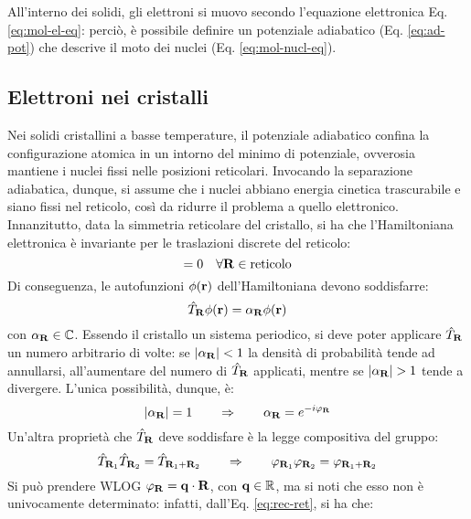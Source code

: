 All'interno dei solidi, gli elettroni si muovo secondo l'equazione elettronica Eq. \ref{eq:mol-el-eq}: perciò, è possibile definire un potenziale adiabatico (Eq. \ref{eq:ad-pot}) che descrive il moto dei nuclei (Eq. \ref{eq:mol-nucl-eq}).

\subsection{Elettroni nei cristalli}

Nei solidi cristallini a basse temperature, il potenziale adiabatico confina la configurazione atomica in un intorno del minimo di potenziale, ovverosia mantiene i nuclei fissi nelle posizioni reticolari. Invocando la separazione adiabatica, dunque, si assume che i nuclei abbiano energia cinetica trascurabile e siano fissi nel reticolo, così da ridurre il problema a quello elettronico. \\
Innanzitutto, data la simmetria reticolare del cristallo, si ha che l'Hamiltoniana elettronica è invariante per le traslazioni discrete del reticolo:
\begin{equation}
	[\hat{\mathcal{H}} , \hat{T}_\ve{R}] = 0 \quad \forall \ve{R} \in \text{reticolo}
\end{equation}
Di conseguenza, le autofunzioni $ \phi(\mathbf{r}) $ dell'Hamiltoniana devono soddisfarre:
\begin{equation}
	\hat{T}_{\mathbf{R}} \phi(\mathbf{r}) = \alpha_{\mathbf{R}} \phi(\mathbf{r})
\end{equation}
con $ \alpha_{\mathbf{R}} \in \mathbb{C} $. Essendo il cristallo un sistema periodico, si deve poter applicare $ \hat{T}_{\mathbf{R}} $ un numero arbitrario di volte: se $ \left\lvert\alpha_{\mathbf{R}}\right\rvert < 1 $ la densità di probabilità tende ad annullarsi, all'aumentare del numero di $ \hat{T}_{\mathbf{R}} $ applicati, mentre se $ \left\lvert\alpha_{\mathbf{R}}\right\rvert > 1 $ tende a divergere. L'unica possibilità, dunque, è:
\begin{equation*}
	\left\lvert\alpha_{\mathbf{R}}\right\rvert = 1
	\qquad \Rightarrow \qquad
	\alpha_{\mathbf{R}} = e^{-i \varphi_{\mathbf{R}}}
\end{equation*}
Un'altra proprietà che $ \hat{T}_{\mathbf{R}} $ deve soddisfare è la legge compositiva del gruppo:
\begin{equation*}
	\hat{T}_{\mathbf{R}_1} \hat{T}_{\mathbf{R}_2} = \hat{T}_{\mathbf{R}_1 + \mathbf{R}_2}
	\qquad \Rightarrow \qquad
	\varphi_{\mathbf{R}_1} \varphi_{\mathbf{R}_2} = \varphi_{\mathbf{R}_1 + \mathbf{R}_2}
\end{equation*}
Si può prendere WLOG $ \varphi_{\mathbf{R}} = \mathbf{q} \cdot \mathbf{R} $, con $ \mathbf{q} \in \mathbb{R} $, ma si noti che esso non è univocamente determinato: infatti, dall'Eq. \ref{eq:rec-ret}, si ha che:
